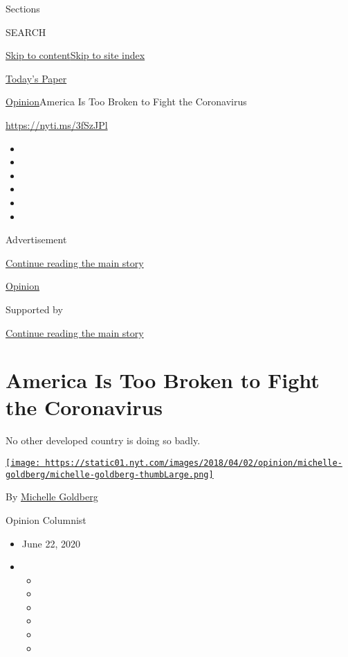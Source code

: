 Sections

SEARCH

\protect\hyperlink{site-content}{Skip to
content}\protect\hyperlink{site-index}{Skip to site index}

\href{https://myaccount.nytimes.com/auth/login?response_type=cookie\&client_id=vi}{}

\href{https://www.nytimes.com/section/todayspaper}{Today's Paper}

\href{/section/opinion}{Opinion}\textbar{}America Is Too Broken to Fight
the Coronavirus

\href{https://nyti.ms/3fSzJPl}{https://nyti.ms/3fSzJPl}

\begin{itemize}
\item
\item
\item
\item
\item
\item
\end{itemize}

Advertisement

\protect\hyperlink{after-top}{Continue reading the main story}

\href{/section/opinion}{Opinion}

Supported by

\protect\hyperlink{after-sponsor}{Continue reading the main story}

\hypertarget{america-is-too-broken-to-fight-the-coronavirus}{%
\section{America Is Too Broken to Fight the
Coronavirus}\label{america-is-too-broken-to-fight-the-coronavirus}}

No other developed country is doing so badly.

\href{https://www.nytimes.com/by/michelle-goldberg}{\texttt{[image: https://static01.nyt.com/images/2018/04/02/opinion/michelle-goldberg/michelle-goldberg-thumbLarge.png]}}

By \href{https://www.nytimes.com/by/michelle-goldberg}{Michelle
Goldberg}

Opinion Columnist

\begin{itemize}
\item
  June 22, 2020
\item
  \begin{itemize}
  \item
  \item
  \item
  \item
  \item
  \item
  \end{itemize}
\end{itemize}

